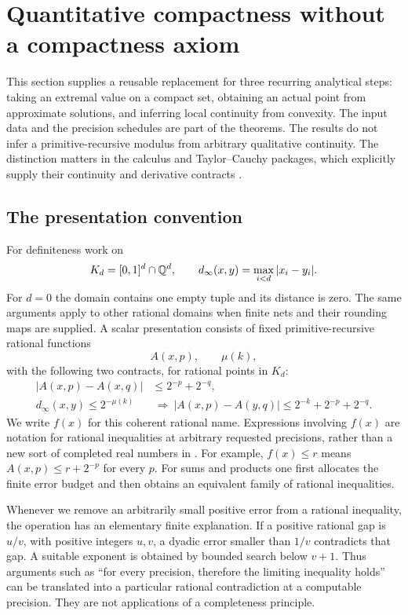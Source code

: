 \section{Quantitative compactness without a compactness axiom}
\label{sec:quantitative-analysis}

This section supplies a reusable replacement for three recurring analytical
steps: taking an extremal value on a compact set, obtaining an actual point
from approximate solutions, and inferring local continuity from convexity.
The input data and the precision schedules are part of the theorems.  The
results do not infer a primitive-recursive modulus from arbitrary qualitative
continuity.  The distinction matters in the calculus and Taylor--Cauchy
packages, which explicitly supply their continuity and derivative contracts
\cite{repo-calculus,repo-taylor}.

\subsection{The presentation convention}

For definiteness work on
\[
 K_d=[0,1]^d\cap\mathbb Q^d,\qquad
 d_\infty(x,y)=\max_{i<d}|x_i-y_i|.
\]
For $d=0$ the domain contains one empty tuple and its distance is zero.
The same arguments apply to other rational domains when finite nets and
their rounding maps are supplied.  A scalar presentation consists of fixed
primitive-recursive rational functions
\[
 A(x,p),\qquad \mu(k),
\]
with the following two contracts, for rational points in $K_d$:
\begin{align}
 |A(x,p)-A(x,q)|&\le 2^{-p}+2^{-q},
       \label{eq:analysis-coherence}\\
 d_\infty(x,y)\le2^{-\mu(k)}
 &\ \Longrightarrow\ 
 |A(x,p)-A(y,q)|\le2^{-k}+2^{-p}+2^{-q}.
       \label{eq:analysis-continuity}
\end{align}
We write $f(x)$ for this coherent rational name.  Expressions involving
$f(x)$ are notation for rational inequalities at arbitrary requested
precisions, rather than a new sort of completed real numbers in \iPRA.
For example, $f(x)\le r$ means
$A(x,p)\le r+2^{-p}$ for every $p$.  For sums and products one first
allocates the finite error budget and then obtains an equivalent family of
rational inequalities.

Whenever we remove an arbitrarily small positive error from a rational
inequality, the operation has an elementary finite explanation.  If a
positive rational gap is $u/v$, with positive integers $u,v$, a dyadic error
smaller than $1/v$ contradicts that gap.  A suitable exponent is obtained by
bounded search below $v+1$.  Thus arguments such as ``for every precision,
therefore the limiting inequality holds'' can be translated into a
particular rational contradiction at a computable precision.  They are not
applications of a completeness principle.

